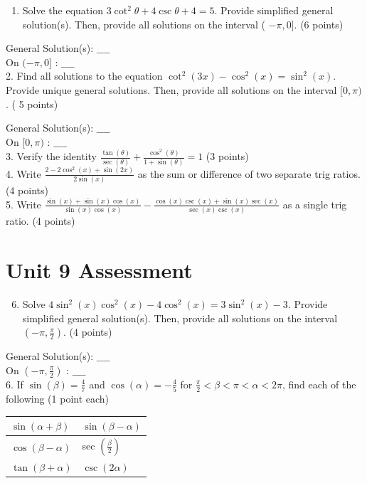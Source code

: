\documentclass[10pt]{article}
\begin{document}
\begin{enumerate}
  \item Solve the equation $3 \cot ^{2} \theta+4 \csc \theta+4=5$. Provide simplified general solution(s). Then, provide all solutions on the interval ( $-\pi, 0]$. (6 points)
\end{enumerate}

General Solution(s): $\_\_\_\_$\\
On $(-\pi, 0]$ : $\_\_\_\_$\\
2. Find all solutions to the equation $\cot ^{2}(3 x)-\cos ^{2}(x)=\sin ^{2}(x)$. Provide unique general solutions. Then, provide all solutions on the interval $[0, \pi)$. ( 5 points)

General Solution(s): $\_\_\_\_$\\
On $[0, \pi)$ : $\_\_\_\_$\\
3. Verify the identity $\frac{\tan (\theta)}{\sec (\theta)}+\frac{\cos ^{2}(\theta)}{1+\sin (\theta)}=1$ (3 points)\\
4. Write $\frac{2-2 \cos ^{2}(x)+\sin (2 x)}{2 \sin (x)}$ as the sum or difference of two separate trig ratios. (4 points)\\
5. Write $\frac{\sin (x)+\sin (x) \cos (x)}{\sin (x) \cos (x)}-\frac{\cos (x) \csc (x)+\sin (x) \sec (x)}{\sec (x) \csc (x)}$ as a single trig ratio. (4 points)

\section*{Unit 9 Assessment}
\begin{enumerate}
  \setcounter{enumi}{5}
  \item Solve $4 \sin ^{2}(x) \cos ^{2}(x)-4 \cos ^{2}(x)=3 \sin ^{2}(x)-3$. Provide simplified general solution(s). Then, provide all solutions on the interval $\left(-\pi, \frac{\pi}{2}\right)$. (4 points)
\end{enumerate}

General Solution(s): $\_\_\_\_$\\
On $\left(-\pi, \frac{\pi}{2}\right)$ : $\_\_\_\_$\\
6. If $\sin (\beta)=\frac{4}{7}$ and $\cos (\alpha)=-\frac{4}{5}$ for $\frac{\pi}{2}<\beta<\pi<\alpha<2 \pi$, find each of the following (1 point each)

\begin{center}
\begin{tabular}{|l|l|}
\hline
$\sin (\alpha+\beta)$ & $\sin (\beta-\alpha)$ \\
\hline
$\cos (\beta-\alpha)$ & sec $\left(\frac{\beta}{2}\right)$ \\
\hline
$\tan (\beta+\alpha)$ & $\csc (2 \alpha)$ \\
\hline
\end{tabular}
\end{center}
\end{document}
